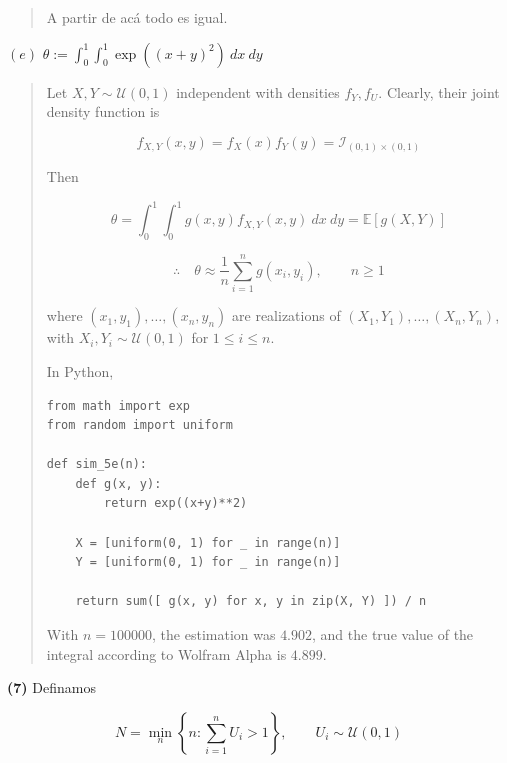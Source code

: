 \documentclass[a4paper, 12pt]{article}
\begin{document}
\begin{quote}
A partir de acá todo es igual.


\end{quote}
\normalsize

\pagebreak
$(e)$ $\theta := \int_0^1 \int_0^1 \exp(( x+y )^2) ~ dx ~ dy$


\small
\begin{quote}

Let $X, Y \sim \mathcal{U}(0, 1)$ independent with densities $f_Y, f_U$. Clearly, their
joint density function is 

\begin{equation*}
  f_{X, Y}(x, y) = f_X(x)f_Y(y) = \mathcal{I}_{(0, 1) \times (0, 1)}
\end{equation*}

Then 

\begin{equation*}
  \theta = \int_0^1 \int_0^1 g(x, y) f_{X, Y}(x, y) ~ dx ~ dy = \mathbb{E}\left[
  g(X, Y)\right] 
\end{equation*}

\begin{equation*}
  \therefore \quad \theta \approx \frac{1}{n} \sum_{i=1}^{n} g(x_i, y_i), \qquad
  n \geq 1
\end{equation*}

where $(x_1, y_1), \ldots, (x_n,y_n)$ are realizations of $(X_1, Y_1),
\ldots, (X_n, Y_n)$, with $X_i, Y_i \sim \mathcal{U}(0, 1)$ for $1 \leq i \leq
n$.

In Python,

\footnotesize 

\begin{verbatim}
from math import exp 
from random import uniform 

def sim_5e(n):
    def g(x, y):
        return exp((x+y)**2)
    
    X = [uniform(0, 1) for _ in range(n)]
    Y = [uniform(0, 1) for _ in range(n)]

    return sum([ g(x, y) for x, y in zip(X, Y) ]) / n
\end{verbatim}

With $n = 100000$, the estimation was $4.902$, and the true value of the
integral according to Wolfram Alpha is $4.899$.

\end{quote}
\normalsize


\pagebreak 

\textbf{(7)} Definamos 

\begin{equation*}
  N = \min_{n} \left\{ n : \sum_{i=1}^n U_i > 1 \right\}, \qquad U_i \sim
  \mathcal{U}(0, 1)
\end{equation*}
\end{document}
